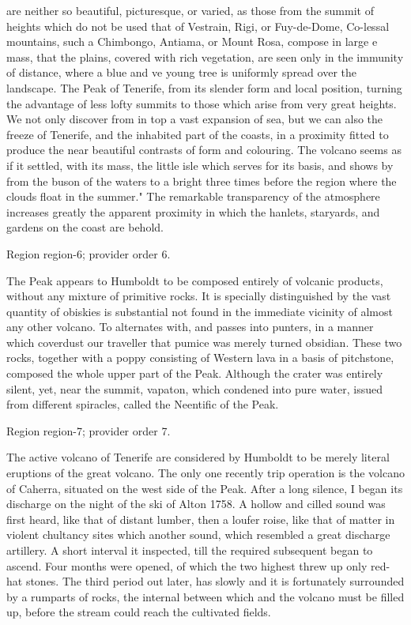 \documentclass[11pt]{article}
\begin{document}
are neither so beautiful, picturesque, or varied, as those from the summit of heights which do not be used that of Vestrain, Rigi, or Fuy-de-Dome, Co-lessal mountains, such a Chimbongo, Antiama, or Mount Rosa, compose in large e mass, that the plains, covered with rich vegetation, are seen only in the immunity of distance, where a blue and ve young tree is uniformly spread over the landscape. The Peak of Tenerife, from its slender form and local position, turning the advantage of less lofty summits to those which arise from very great heights. We not only discover from in top a vast expansion of sea, but we can also the freeze of Tenerife, and the inhabited part of the coasts, in a proximity fitted to produce the near beautiful contrasts of form and colouring. The volcano seems as if it settled, with its mass, the little isle which serves for its basis, and shows by from the buson of the waters to a bright three times before the region where the clouds float in the summer." The remarkable transparency of the atmosphere increases greatly the apparent proximity in which the hanlets, staryards, and gardens on the coast are behold.
\par

{\scriptsize\color{gray} Region region-6; provider order 6.\par}
\medskip

The Peak appears to Humboldt to be composed entirely of volcanic products, without any mixture of primitive rocks. It is specially distinguished by the vast quantity of obiskies is substantial not found in the immediate vicinity of almost any other volcano. To alternates with, and passes into punters, in a manner which coverdust our traveller that pumice was merely turned obsidian. These two rocks, together with a poppy consisting of Western lava in a basis of pitchstone, composed the whole upper part of the Peak. Although the crater was entirely silent, yet, near the summit, vapaton, which condened into pure water, issued from different spiracles, called the Neentific of the Peak.
\par

{\scriptsize\color{gray} Region region-7; provider order 7.\par}
\medskip

The active volcano of Tenerife are considered by Humboldt to be merely literal eruptions of the great volcano. The only one recently trip operation is the volcano of Caherra, situated on the west side of the Peak. After a long silence, I began its discharge on the night of the ski of Alton 1758. A hollow and cilled sound was first heard, like that of distant lumber, then a loufer roise, like that of matter in violent chultancy sites which another sound, which resembled a great discharge artillery. A short interval it inspected, till the required subsequent began to ascend. Four months were opened, of which the two highest threw up only red-hat stones. The third period out later, has slowly and it is fortunately surrounded by a rumparts of rocks, the internal between which and the volcano must be filled up, before the stream could reach the cultivated fields.
\par
\end{document}
